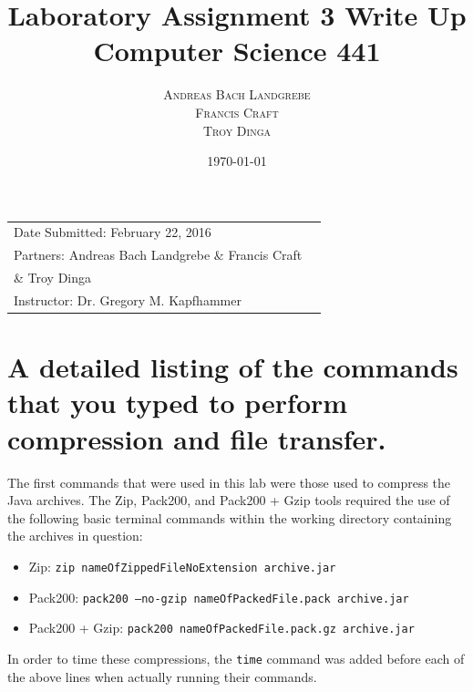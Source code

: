 \documentclass{article}
\title{Laboratory Assignment 3 Write Up \\ Computer Science 441} %
\author{\textsc{Andreas Bach Landgrebe} \\
\textsc{Francis Craft} \\
\textsc{Troy Dinga}} %
\date{\today} %
\begin{document}
\maketitle %

\begin{center}
\begin{tabular}{l r}
Date Submitted:  February 22, 2016 \\ %
Partners:  Andreas Bach Landgrebe \& Francis Craft \\ \& Troy Dinga \\ %
Instructor:  Dr. Gregory M. Kapfhammer  %
\end{tabular}
\end{center}



\section{A detailed listing of the commands that you typed to perform compression and file transfer.}

The first commands that were used in this lab were those used to compress the Java archives. The Zip, Pack200, and Pack200 + Gzip tools required the use of the following basic terminal commands within the working directory containing the archives in question: 

\begin{itemize}
	\item Zip: \texttt{zip nameOfZippedFileNoExtension archive.jar}
	\item Pack200: \texttt{pack200 --no-gzip nameOfPackedFile.pack archive.jar}
	\item Pack200 + Gzip: \texttt{pack200 nameOfPackedFile.pack.gz archive.jar}
\end{itemize}

In order to time these compressions, the \texttt{time} command was added before each of the above lines when actually running their commands. 
\end{document}
